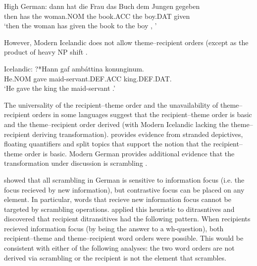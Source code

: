 \documentclass[11pt]{upenndiss}
\begin{document}
\begin{exe}
		\ex High German:
		\gll dann hat die Frau das Buch dem Jungen gegeben\\
		then has the woman.NOM the book.ACC the boy.DAT given\\
		`then the woman has given the book to the boy \citep[ex 1b]{Czepluch.1990}, \citep[20b]{Choi.1996}'
\end{exe}

However, Modern Icelandic does not allow theme--recipient orders (except as the product of heavy NP shift \citep{Dehe.2004}.

\begin{exe}
\ex Icelandic:
\gll ?*Hann gaf amb\'attina konunginum.\\
He.NOM gave maid-servant.DEF.ACC king.DEF.DAT. \\
\trans `He gave the king the maid-servant \citep[ex 14b]{Dehe.2004}.'
\end{exe}

The universality of the recipient--theme order and the unavailability of theme--recipient orders in some languages suggest that the recipient--theme order is basic and the theme--recipient order derived (with Modern Icelandic lacking the theme--recipient deriving transformation). \cite{Georgala.2011} provides evidence from stranded depictives, floating quantifiers and split topics that support the notion that the recipient--theme order is basic. Modern German provides additional evidence that the transformation under discussion is scrambling \citep{Lenerz.1977,Abraham.1986,Webelhuth.1992,Choi.1996}.

\cite{Lenerz.1977} showed that all scrambling in German is sensitive to information focus (i.e. the focus recieved by new information), but contrastive focus can be placed on any element. In particular, words that recieve new information focus cannot be targeted by scrambling operations. \cite{Lenerz.1977} applied this heuristic to ditrasntives and discovered that recipient ditransitives had the following pattern. When recipients recieved information focus (by being the answer to a wh-question), both recipient--theme and theme--recipient word orders were possible. This would be consistent with either of the following analyses: the two word orders are not derived via scrambling or the recipient is not the element that scrambles.
\end{document}
